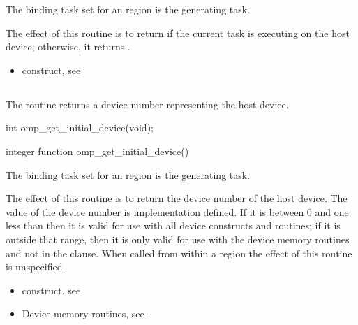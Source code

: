 \binding
The binding task set for an  region is the generating task.

\effect
The effect of this routine is to return  if the current task is executing on the host
device; otherwise, it returns .

\crossreferences
\begin{itemize}
\item {} construct, see
\end{itemize}





\subsection{}
\label{subsec:omp_get_initial_device}
\summary
The  routine returns a device number representing
the host device.

\begin{samepage}
\format
\begin{ccppspecific}
\begin{ompcFunction}
int omp_get_initial_device(void);
\end{ompcFunction}
\end{ccppspecific}
\end{samepage}

\begin{fortranspecific}
\begin{ompfFunction}
integer function omp_get_initial_device()
\end{ompfFunction}
\end{fortranspecific}

\binding
The binding task set for an  region is the generating task.

\effect
The effect of this routine is to return the device number of the host device.
The value of the device number is implementation defined. If it is between 0
and one less than  then it is valid for use
with all device constructs and routines; if it is outside that range, then
it is only valid for use with the device memory routines and not in the
 clause. When called from within a  region
the effect of this routine is unspecified.

\crossreferences
\begin{itemize}
\item {} construct, see

\item Device memory routines, see .
\end{itemize}




